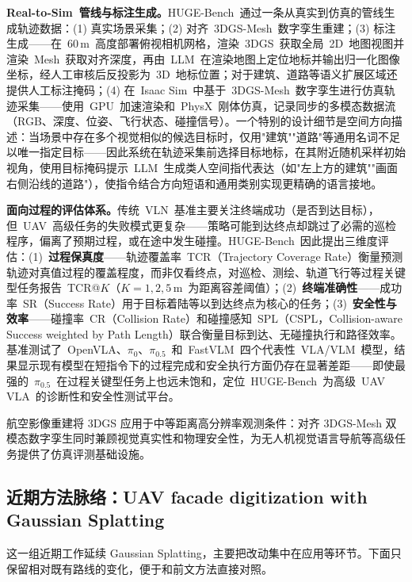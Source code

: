 \textbf{Real-to-Sim~管线与标注生成。}HUGE-Bench~通过一条从真实到仿真的管线生成轨迹数据：(1) 真实场景采集；(2) 对齐~3DGS-Mesh~数字孪生重建；(3) 标注生成——在~60\,m~高度部署俯视相机网格，渲染~3DGS~获取全局~2D~地图视图并渲染~Mesh~获取对齐深度，再由~LLM~在渲染地图上定位地标并输出归一化图像坐标，经人工审核后反投影为~3D~地标位置；对于建筑、道路等语义扩展区域还提供人工标注掩码；(4) 在~Isaac Sim~中基于~3DGS-Mesh~数字孪生进行仿真轨迹采集——使用~GPU~加速渲染和~PhysX~刚体仿真，记录同步的多模态数据流（RGB、深度、位姿、飞行状态、碰撞信号）。一个特别的设计细节是空间方向描述：当场景中存在多个视觉相似的候选目标时，仅用"建筑""道路"等通用名词不足以唯一指定目标——因此系统在轨迹采集前选择目标地标，在其附近随机采样初始视角，使用目标掩码提示~LLM~生成类人空间指代表达（如"左上方的建筑""画面右侧沿线的道路"），使指令结合方向短语和通用类别实现更精确的语言接地。

\textbf{面向过程的评估体系。}传统~VLN~基准主要关注终端成功（是否到达目标），但~UAV~高级任务的失败模式更复杂——策略可能到达终点却跳过了必需的巡检程序，偏离了预期过程，或在途中发生碰撞。HUGE-Bench~因此提出三维度评估：(1)~\textbf{过程保真度}——轨迹覆盖率~TCR（Trajectory Coverage Rate）衡量预测轨迹对真值过程的覆盖程度，而非仅看终点，对巡检、测绘、轨道飞行等过程关键型任务报告~TCR@$K$（$K=1,2,5$\,m~为距离容差阈值）；(2)~\textbf{终端准确性}——成功率~SR（Success Rate）用于目标着陆等以到达终点为核心的任务；(3)~\textbf{安全性与效率}——碰撞率~CR（Collision Rate）和碰撞感知~SPL（CSPL，Collision-aware Success weighted by Path Length）联合衡量目标到达、无碰撞执行和路径效率。基准测试了~OpenVLA、$\pi_0$、$\pi_{0.5}$~和~FastVLM~四个代表性~VLA/VLM~模型，结果显示现有模型在短指令下的过程完成和安全执行方面仍存在显著差距——即使最强的~$\pi_{0.5}$~在过程关键型任务上也远未饱和，定位~HUGE-Bench~为高级~UAV VLA~的诊断性和安全性测试平台。

\begin{takeaway}
航空影像重建将 3DGS 应用于中等距离高分辨率观测条件：对齐 3DGS-Mesh 双模态数字孪生同时兼顾视觉真实性和物理安全性，为无人机视觉语言导航等高级任务提供了仿真评测基础设施。
\end{takeaway}


\subsection{近期方法脉络：UAV facade digitization with Gaussian Splatting}

这一组近期工作延续 Gaussian Splatting，主要把改动集中在应用等环节。下面只保留相对既有路线的变化，便于和前文方法直接对照。

